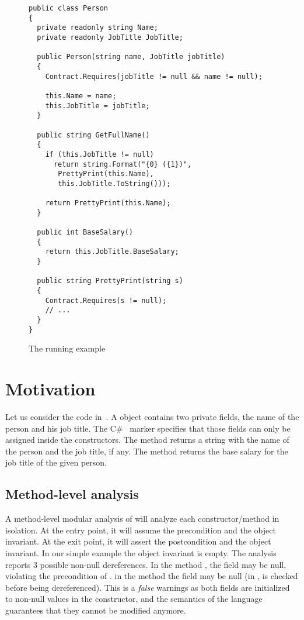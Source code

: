 \documentclass{llncs}
\newcommand{\labelFig}[1]{\label{fig:#1}}
\begin{document}
\begin{figure}[th]
\begin{lstlisting}
public class Person
{
  private readonly string Name;
  private readonly JobTitle JobTitle;

  public Person(string name, JobTitle jobTitle)
  {
    Contract.Requires(jobTitle != null && name != null);

    this.Name = name;
    this.JobTitle = jobTitle;
  }

  public string GetFullName()
  {
    if (this.JobTitle != null)
      return string.Format("{0} ({1})", 
       PrettyPrint(this.Name), 
       this.JobTitle.ToString()));

    return PrettyPrint(this.Name);
  }

  public int BaseSalary()
  {
    return this.JobTitle.BaseSalary;
  }

  public string PrettyPrint(string s)
  {
    Contract.Requires(s != null);  
    // ...
  }
}
\end{lstlisting}
\caption{The running example}
\labelFig{example}
\end{figure}

\section{Motivation}
Let us consider the code in~.
A  object contains two private fields, the name of the person and his job title.
The C\#\  marker specifies that those fields can only be assigned inside the constructors.
The method  returns a string with the name of the person and the job title, if any.
The method  returns the base salary for the job title of the given person.


\subsection{Method-level analysis}
\label{sec:methodlevelanalysis}
A method-level modular analysis of  will analyze each constructor/method in isolation.
At the entry point, it will assume the precondition and the object invariant.
At the exit point, it will assert the postcondition and the object invariant.
In our simple example the object invariant is empty.
The analysis  reports $3$ possible non-null dereferences.
In the method , the field  may be null, violating the precondition of .
in the method  the field  may be null (in ,   is checked before being dereferenced). 
This  is a \emph{false} warnings as both fields are initialized to non-null values in the constructor, and the semantics of the language guarantees that they cannot be modified anymore.
\end{document}
